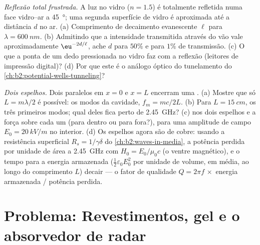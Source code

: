 \begin{exercise}[$\star\star\star$]\label{exo:b2:wave-interfaces:11}
\emph{Reflexão total frustrada.} A luz no vidro ($n = 1.5$) é
totalmente refletida numa face vidro--ar a \qty{45}{\degree}; uma segunda superfície
de vidro é aproximada até a distância $d$ no ar. (a) Comprimento de decaimento
evanescente $\ell$ para $\lambda = \qty{600}{nm}$. (b) Admitindo que a intensidade
transmitida através do vão vale aproximadamente $\eu^{-2d/\ell}$, ache $d$ para $50\%$
e para $1\%$ de transmissão. (c) O que a ponta de um dedo pressionada no vidro
faz com a reflexão (leitores de impressão digital)? (d) Por que este é o
análogo óptico do tunelamento do
\cref{ch:b2:potential-wells-tunneling}?
\end{exercise}

\begin{exercise}[$\star\star\star$]\label{exo:b2:wave-interfaces:12}
\emph{Dois espelhos.} Dois  paralelos em $x = 0$ e $x =
L$ encerram uma . (a) Mostre que só $L = m\lambda/2$ é possível:
os modos da cavidade, $f_m = mc/2L$. (b) Para $L = \qty{15}{cm}$, os três
primeiros modos; qual deles fica perto de \qty{2.45}{GHz}? (c)  nos
dois espelhos e a força sobre cada um (para dentro ou para fora?), para uma amplitude
de campo $E_0 = \qty{20}{kV/m}$ no interior. (d) Os espelhos agora são de cobre:
usando a resistência superficial $R_s = 1/\gamma\delta$ do
\cref{ch:b2:waves-in-media}, a potência perdida por unidade de área a
\qty{2.45}{GHz} com $H_0 = E_0/\mu_0c$ (o ventre magnético), e o tempo para a energia armazenada
($\tfrac12\varepsilon_0E_0^2$ por unidade de volume, em média, ao longo do comprimento $L$)
decair --- o fator de qualidade $Q = 2\pi f\,\times$ energia armazenada / potência perdida.
\end{exercise}

\section{Problema: Revestimentos, gel e o absorvedor de radar}

